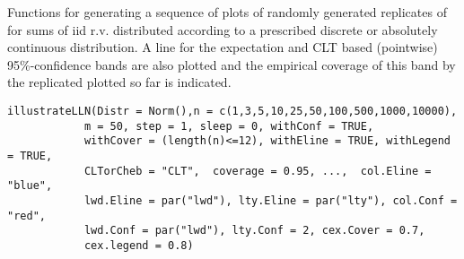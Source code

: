 \begin{Description}\relax
Functions for generating a sequence of plots of
randomly generated replicates of 
for sums of iid r.v. distributed according to a prescribed discrete or 
absolutely continuous distribution. A line for the expectation and CLT based
(pointwise) 95\%-confidence bands are also plotted and the empirical coverage
of this band by the replicated plotted so far is indicated.
\end{Description}
\begin{Usage}
\begin{verbatim}illustrateLLN(Distr = Norm(),n = c(1,3,5,10,25,50,100,500,1000,10000), 
            m = 50, step = 1, sleep = 0, withConf = TRUE, 
            withCover = (length(n)<=12), withEline = TRUE, withLegend = TRUE,
            CLTorCheb = "CLT",  coverage = 0.95, ...,  col.Eline = "blue", 
            lwd.Eline = par("lwd"), lty.Eline = par("lty"), col.Conf = "red", 
            lwd.Conf = par("lwd"), lty.Conf = 2, cex.Cover = 0.7, 
            cex.legend = 0.8)
\end{verbatim}
\end{Usage}
